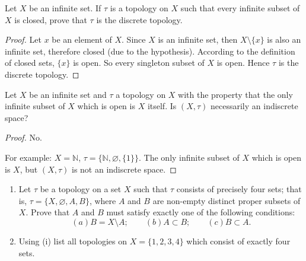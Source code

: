 \begin{exercise}
    Let $X$ be an infinite set. If $\tau$ is a topology on $X$ such that every infinite subset of $X$ is closed, prove that $\tau$ is the discrete topology.
\end{exercise}

\begin{proof}
    Let $x$ be an element of $X$. Since $X$ is an infinite set, then $X\setminus\{ x \}$ is also an infinite set, therefore closed (due to the hypothesis). According to the definition of closed sets, $\{ x \}$ is open. So every singleton subset of $X$ is open. Hence $\tau$ is the discrete topology.
\end{proof}
\newpage

\begin{exercise}
    Let $X$ be an infinite set and $\tau$ a topology on $X$ with the property that the only infinite subset of $X$ which is open is $X$ itself. Is $(X, \tau)$ necessarily an indiscrete space?
\end{exercise}

\begin{proof}
    No.

    For example: $X = \mathbb{N}$, $\tau = \{ \mathbb{N}, \varnothing, \{ 1 \} \}$. The only infinite subset of $X$ which is open is $X$, but $(X, \tau)$ is not an indiscrete space.
\end{proof}
\newpage

\begin{exercise}
    \begin{enumerate}[label={(\roman*)}]
        \item Let $\tau$ be a topology on a set $X$ such that $\tau$ consists of precisely four sets; that is, $\tau = \{ X, \varnothing, A, B \}$, where $A$ and $B$ are non-empty distinct proper subsets of $X$. Prove that $A$ and $B$ must satisfy exactly one of the following conditions:
              \[
                  (a) B = X\setminus A;\qquad (b) A\subset B;\qquad (c) B\subset A.
              \]
        \item Using (i) list all topologies on $X = \{ 1, 2, 3, 4 \}$ which consist of exactly four sets.
    \end{enumerate}
\end{exercise}

